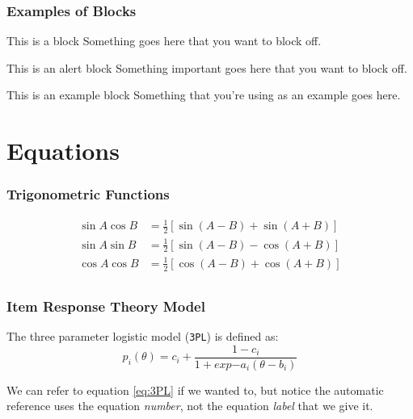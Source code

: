 \documentclass{beamer}
\begin{document}
\begin{frame}
\frametitle{Examples of Blocks}
\begin{block}{This is a block}
Something goes here that you want to block off.
\end{block}
\begin{alertblock}{This is an alert block}
\vspace{.1cm} %
Something important goes here that you want to block off.
\vspace{.1cm}
\end{alertblock}
\begin{exampleblock}{This is an example block}
\vspace{.1cm}
Something that you're using as an example goes here.
\vspace{.1cm}
\end{exampleblock}
\end{frame}

\section{Equations}

\begin{frame}
\frametitle{Trigonometric Functions}
\begin{align*}
          \sin A \cos B &= \frac{1}{2}\left[ \sin(A-B)+\sin(A+B) \right] \\
          \sin A \sin B &= \frac{1}{2}\left[ \sin(A-B)-\cos(A+B) \right] \\
          \cos A \cos B &= \frac{1}{2}\left[ \cos(A-B)+\cos(A+B) \right] \\
          \end{align*}
\end{frame}

\begin{frame}[fragile]
\frametitle{Item Response Theory Model}
The three parameter logistic model (\verb|3PL|) is defined as:
\begin{equation}\label{eq:3PL}
p_i(\theta)=c_i+\frac{1-c_i}{1+exp{-a_i(\theta-b_i)}}
\end{equation}

We can refer to equation \eqref{eq:3PL} if we wanted to, but notice the automatic reference uses the equation \emph{number}, not the equation \emph{label} that we give it.
\end{frame}
\end{document}
